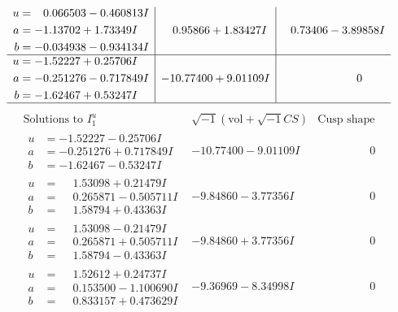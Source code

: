 \documentclass[1p]{elsarticle_modified}
\theoremstyle{definition}
\newcommand{\I}{\sqrt{-1}}
\begin{document}
$$\begin{array}{c|c|c}
\begin{aligned}
u &= \phantom{-}0.066503 - 0.460813 I \\
a &= -1.13702 + 1.73349 I \\
b &= -0.034938 - 0.934134 I\end{aligned}
 & \phantom{-}0.95866 + 1.83427 I & \phantom{-}0.73406 - 3.89858 I \\ \hline\begin{aligned}
u &= -1.52227 + 0.25706 I \\
a &= -0.251276 - 0.717849 I \\
b &= -1.62467 + 0.53247 I\end{aligned}
 & -10.77400 + 9.01109 I & \phantom{-0.000000 } 0\\
 \hline 
 \end{array}$$\newpage$$\begin{array}{c|c|c}  
\text{Solutions to }I^u_{1}& \I (\text{vol} + \sqrt{-1}CS) & \text{Cusp shape}\\
 \hline 
\begin{aligned}
u &= -1.52227 - 0.25706 I \\
a &= -0.251276 + 0.717849 I \\
b &= -1.62467 - 0.53247 I\end{aligned}
 & -10.77400 - 9.01109 I & \phantom{-0.000000 } 0 \\ \hline\begin{aligned}
u &= \phantom{-}1.53098 + 0.21479 I \\
a &= \phantom{-}0.265871 - 0.505711 I \\
b &= \phantom{-}1.58794 + 0.43363 I\end{aligned}
 & -9.84860 - 3.77356 I & \phantom{-0.000000 } 0 \\ \hline\begin{aligned}
u &= \phantom{-}1.53098 - 0.21479 I \\
a &= \phantom{-}0.265871 + 0.505711 I \\
b &= \phantom{-}1.58794 - 0.43363 I\end{aligned}
 & -9.84860 + 3.77356 I & \phantom{-0.000000 } 0 \\ \hline\begin{aligned}
u &= \phantom{-}1.52612 + 0.24737 I \\
a &= \phantom{-}0.153500 - 1.100690 I \\
b &= \phantom{-}0.833157 + 0.473629 I\end{aligned}
 & -9.36969 - 8.34998 I & \phantom{-0.000000 } 0 \\ \hline\begin{aligned}

\end{aligned}
\end{array}$$
\end{document}
